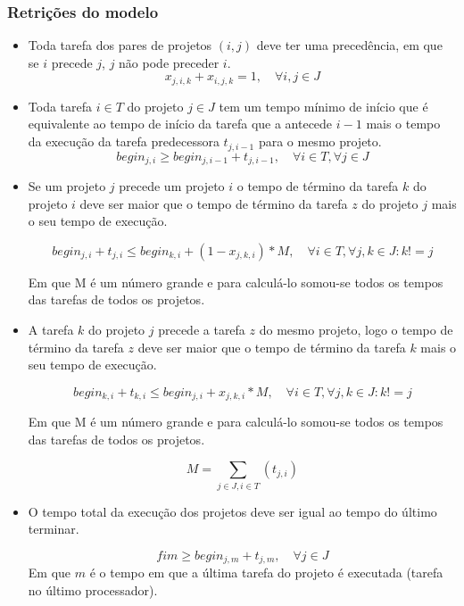 \documentclass[11pt,letterpaper]{article}
\begin{document}
\subsubsection*{Retrições do modelo}
\begin{itemize}
\item Toda tarefa dos pares de projetos $(i,j)$ deve ter uma precedência, em que se $i$
  precede $j$, $j$ não pode preceder $i$. 
\begin{equation*}
  x_{j,i,k}+x_{i,j,k}=1, \quad \forall i,j \in J
\end{equation*}

\item Toda tarefa $i \in T$ do projeto  $j \in J$ tem um tempo mínimo de início que é equivalente ao tempo de início da tarefa que a antecede $i -1$ mais o tempo da execução da tarefa predecessora $ t_{j,i-1}$ para o mesmo projeto. 
\begin{equation*}
  begin_{j,i} \geq begin_{j,i-1}+ t_{j,i-1}, \quad\forall i \in T, \forall j \in J
\end{equation*}

\item Se um projeto $j$ precede um projeto $i$ o tempo de término da
  tarefa $k$ do projeto $i$ deve ser maior que o tempo de término da
  tarefa $z$ do projeto $j$ mais o seu tempo de execução.
 
\begin{equation*}
  begin_{j,i} + t_{j,i} \leq begin_{k,i}+(1-x_{j,k,i})*M,\quad \forall i \in T, \forall j,k \in J  : k!=j 
\end{equation*}


Em que M é um número grande e para calculá-lo somou-se todos os tempos
das tarefas de todos os projetos. 

\item A tarefa $k$ do projeto $j$ precede a tarefa $z$ do mesmo
  projeto, logo o tempo de término da
  tarefa $z$ deve ser maior que o tempo de término da
  tarefa $k$ mais o seu tempo de execução.
 
\begin{equation*}
  begin_{k,i} + t_{k,i} \leq begin_{j,i}+x_{j,k,i}*M,\quad \forall i \in T , \forall j,k \in J : k!=j 
\end{equation*}

Em que M é um número grande e para calculá-lo somou-se todos os tempos
das tarefas de todos os projetos. 


\begin{equation*}
 M = \sum_{j \in J,i \in T} (t_{j,i}) 
\end{equation*}

\item O tempo total da execução dos projetos deve ser igual ao tempo
  do último terminar.
 
\begin{equation*}
 fim \geq begin_{j,m}+ t_{j,m},\quad \forall j \in J
\end{equation*}
Em que $m$ é o tempo em que a última tarefa do projeto é executada
(tarefa no último processador).
\end{itemize}
\end{document}
